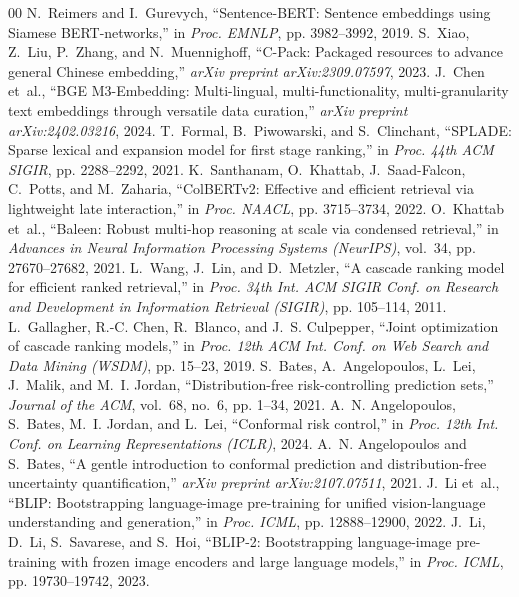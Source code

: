 \begin{thebibliography}{00}
N.~Reimers and I.~Gurevych, ``Sentence-BERT: Sentence embeddings using Siamese BERT-networks,'' in \emph{Proc. EMNLP}, pp. 3982--3992, 2019.
S.~Xiao, Z.~Liu, P.~Zhang, and N.~Muennighoff, ``C-Pack: Packaged resources to advance general Chinese embedding,'' \emph{arXiv preprint arXiv:2309.07597}, 2023.
J.~Chen et~al., ``BGE M3-Embedding: Multi-lingual, multi-functionality, multi-granularity text embeddings through versatile data curation,'' \emph{arXiv preprint arXiv:2402.03216}, 2024.
T.~Formal, B.~Piwowarski, and S.~Clinchant, ``SPLADE: Sparse lexical and expansion model for first stage ranking,'' in \emph{Proc. 44th ACM SIGIR}, pp. 2288--2292, 2021.
K.~Santhanam, O.~Khattab, J.~Saad-Falcon, C.~Potts, and M.~Zaharia, ``ColBERTv2: Effective and efficient retrieval via lightweight late interaction,'' in \emph{Proc. NAACL}, pp. 3715--3734, 2022.
O.~Khattab et~al., ``Baleen: Robust multi-hop reasoning at scale via condensed retrieval,'' in \emph{Advances in Neural Information Processing Systems (NeurIPS)}, vol.~34, pp. 27670--27682, 2021.
L.~Wang, J.~Lin, and D.~Metzler, ``A cascade ranking model for efficient ranked retrieval,'' in \emph{Proc. 34th Int. ACM SIGIR Conf. on Research and Development in Information Retrieval (SIGIR)}, pp. 105--114, 2011.
L.~Gallagher, R.-C. Chen, R.~Blanco, and J.~S. Culpepper, ``Joint optimization of cascade ranking models,'' in \emph{Proc. 12th ACM Int. Conf. on Web Search and Data Mining (WSDM)}, pp. 15--23, 2019.
S.~Bates, A.~Angelopoulos, L.~Lei, J.~Malik, and M.~I. Jordan, ``Distribution-free risk-controlling prediction sets,'' \emph{Journal of the ACM}, vol.~68, no.~6, pp. 1--34, 2021.
A.~N. Angelopoulos, S.~Bates, M.~I. Jordan, and L.~Lei, ``Conformal risk control,'' in \emph{Proc. 12th Int. Conf. on Learning Representations (ICLR)}, 2024.
A.~N. Angelopoulos and S.~Bates, ``A gentle introduction to conformal prediction and distribution-free uncertainty quantification,'' \emph{arXiv preprint arXiv:2107.07511}, 2021.
J.~Li et~al., ``BLIP: Bootstrapping language-image pre-training for unified vision-language understanding and generation,'' in \emph{Proc. ICML}, pp. 12888--12900, 2022.
J.~Li, D.~Li, S.~Savarese, and S.~Hoi, ``BLIP-2: Bootstrapping language-image pre-training with frozen image encoders and large language models,'' in \emph{Proc. ICML}, pp. 19730--19742, 2023.

\end{thebibliography}
